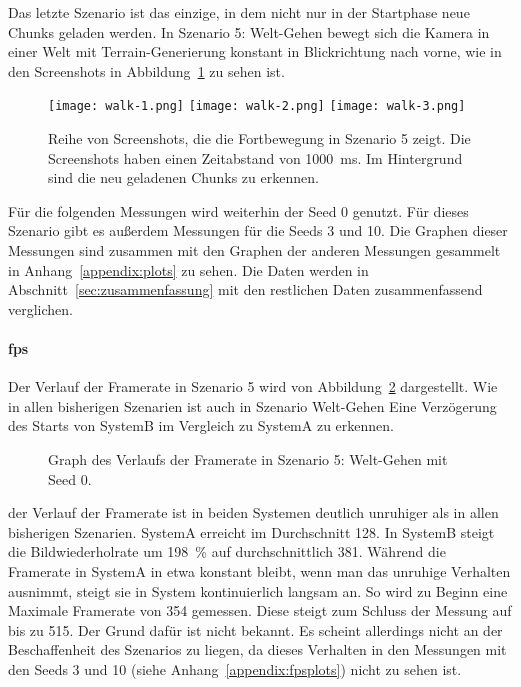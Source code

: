 Das letzte Szenario ist das einzige, in dem nicht nur in der Startphase neue Chunks geladen werden. In Szenario 5: Welt-Gehen bewegt sich die Kamera in einer Welt mit Terrain-Generierung konstant in Blickrichtung nach vorne, wie in den Screenshots in Abbildung~\ref{fig:walk} zu sehen ist.
\begin{figure}[!htbp]
	\centering
	\texttt{[image: walk-1.png]}
	\texttt{[image: walk-2.png]}
	\texttt{[image: walk-3.png]}
	\caption[Reihe von Screenshots, die die Fortbewegung in Szenario 5 zeigt.]{Reihe von Screenshots, die die Fortbewegung in Szenario 5 zeigt. Die Screenshots haben einen Zeitabstand von \SI{1000}{\milli\second}. Im Hintergrund sind die neu geladenen Chunks zu erkennen.}\label{fig:walk}
\end{figure}

Für die folgenden Messungen wird weiterhin der Seed 0 genutzt. Für dieses Szenario gibt es außerdem Messungen für die Seeds 3 und 10. Die Graphen dieser Messungen sind zusammen mit den Graphen der anderen Messungen gesammelt in Anhang~\vref{appendix:plots} zu sehen. Die Daten werden in Abschnitt~\ref{sec:zusammenfassung} mit den restlichen Daten zusammenfassend verglichen.

\paragraph{\ac{fps}}
Der Verlauf der Framerate in Szenario 5 wird von Abbildung~\ref{fig:seed-0-walk-fps} dargestellt. Wie in allen bisherigen Szenarien ist auch in Szenario Welt-Gehen Eine Verzögerung des Starts von SystemB im Vergleich zu SystemA zu erkennen.
\begin{figure}[!htbp]
	\caption{Graph des Verlaufs der Framerate in Szenario 5: Welt-Gehen mit Seed 0.}\label{fig:seed-0-walk-fps}
\end{figure}
der Verlauf der Framerate ist in beiden Systemen deutlich unruhiger als in allen bisherigen Szenarien. SystemA erreicht im Durchschnitt \SI{128}{\fps}. In SystemB steigt die Bildwiederholrate um \SI{198}{\percent} auf durchschnittlich \SI{381}{\fps}. Während die Framerate in SystemA in etwa konstant bleibt, wenn man das unruhige Verhalten ausnimmt, steigt sie in System kontinuierlich langsam an. So wird zu Beginn eine Maximale Framerate von \SI{354}{\fps} gemessen. Diese steigt zum Schluss der Messung auf bis zu \SI{515}{\fps}. Der Grund dafür ist nicht bekannt. Es scheint allerdings nicht an der Beschaffenheit des Szenarios zu liegen, da dieses Verhalten in den Messungen mit den Seeds 3 und 10 (siehe Anhang~\vref{appendix:fpsplots}) nicht zu sehen ist.

